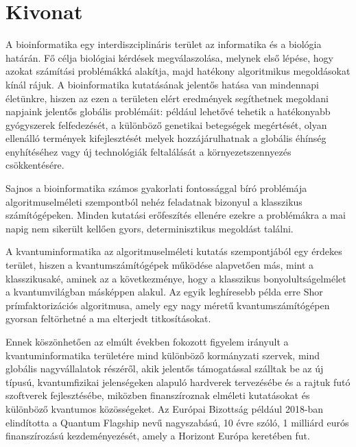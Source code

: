 \setcounter{page}{1}

\selecthungarian

\chapter*{Kivonat}

A bioinformatika egy interdiszciplináris terület az informatika és a biológia határán. Fő célja biológiai kérdések megválaszolása, melynek első lépése, hogy azokat számítási problémákká alakítja, majd hatékony algoritmikus megoldásokat kínál rájuk. A bioinformatika kutatásának jelentős hatása van mindennapi életünkre, hiszen az ezen a területen elért eredmények segíthetnek megoldani napjaink jelentős globális problémáit: például lehetővé tehetik a hatékonyabb gyógyszerek felfedezését, a különböző genetikai betegségek megértését, olyan ellenálló termények kifejlesztését melyek hozzájárulhatnak a globális éhínség enyhítéséhez vagy új technológiák feltalálását a környezetszennyezés csökkentésére.

Sajnos a bioinformatika számos gyakorlati fontossággal bíró problémája algoritmuselméleti szempontból nehéz feladatnak bizonyul a klasszikus számítógépeken. Minden kutatási erőfeszítés ellenére ezekre a problémákra a mai napig nem sikerült kellően gyors, determinisztikus megoldást találni.

A kvantuminformatika az algoritmuselméleti kutatás szempontjából egy érdekes terület, hiszen a kvantumszámítógépek működése alapvetően más, mint a klasszikusaké, aminek az a következménye, hogy a klasszikus bonyolultságelmélet a kvantumvilágban másképpen alakul. Az egyik leghíresebb példa erre Shor prímfaktorizációs algoritmusa, amely egy nagy méretű kvantumszámítógépen gyorsan feltörhetné a ma elterjedt titkosításokat.

Ennek köszönhetően az elmúlt években fokozott figyelem irányult a kvantuminformatika területére mind különböző kormányzati szervek, mind globális nagyvállalatok részéről, akik jelentős támogatással szálltak be az új típusú, kvantumfizikai jelenségeken alapuló hardverek tervezésébe és a rajtuk futó szoftverek fejlesztésébe, miközben finanszíroznak elméleti kutatásokat és különböző kvantumos közösségeket. Az Európai Bizottság például 2018-ban elindította a Quantum Flagship nevű nagyszabású, 10 évre szóló, 1 milliárd eurós finanszírozású kezdeményezését, amely a Horizont Európa keretében fut.

